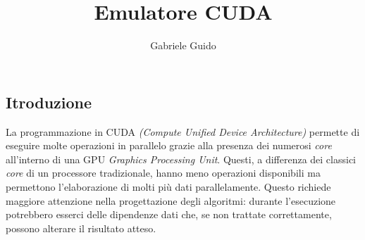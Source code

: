 \documentclass[12pt]{article}
\author{Gabriele Guido}
\title{Emulatore CUDA}
\begin{document}
\maketitle
\clearpage
\begin{center}
    \section*{Itroduzione}
\end{center}
La programmazione in CUDA \textit{(Compute Unified Device Architecture)} 
permette di eseguire molte operazioni 
in parallelo grazie alla presenza dei numerosi \textit{core} 
all'interno di una GPU \textit{Graphics Processing Unit}. Questi, a differenza dei classici 
\textit{core} di un processore tradizionale, hanno meno operazioni disponibili ma permettono 
l'elaborazione di molti più dati parallelamente. Questo richiede maggiore attenzione 
nella progettazione degli algoritmi: durante l'esecuzione potrebbero esserci delle dipendenze 
dati che, se non trattate correttamente, possono alterare il risultato atteso.
    
\end{document}
